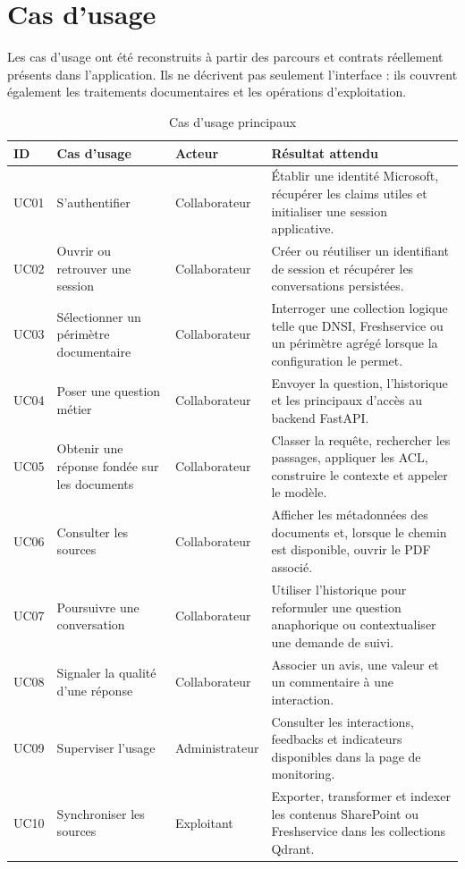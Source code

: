 \section{Cas d'usage}

Les cas d'usage ont été reconstruits à partir des parcours et contrats réellement présents dans l'application. Ils ne décrivent pas seulement l'interface : ils couvrent également les traitements documentaires et les opérations d'exploitation.

\begin{table}[H]
\centering
\caption{Cas d'usage principaux}
\label{tab:usecases_ch4}
\begin{tabular}{p{1.2cm}p{3.6cm}p{2.8cm}p{6.2cm}}
\toprule
\textbf{ID} & \textbf{Cas d'usage} & \textbf{Acteur} & \textbf{Résultat attendu} \\
\midrule
UC01 & S'authentifier & Collaborateur & Établir une identité Microsoft, récupérer les claims utiles et initialiser une session applicative. \\
UC02 & Ouvrir ou retrouver une session & Collaborateur & Créer ou réutiliser un identifiant de session et récupérer les conversations persistées. \\
UC03 & Sélectionner un périmètre documentaire & Collaborateur & Interroger une collection logique telle que DNSI, Freshservice ou un périmètre agrégé lorsque la configuration le permet. \\
UC04 & Poser une question métier & Collaborateur & Envoyer la question, l'historique et les principaux d'accès au backend FastAPI. \\
UC05 & Obtenir une réponse fondée sur les documents & Collaborateur & Classer la requête, rechercher les passages, appliquer les ACL, construire le contexte et appeler le modèle. \\
UC06 & Consulter les sources & Collaborateur & Afficher les métadonnées des documents et, lorsque le chemin est disponible, ouvrir le PDF associé. \\
UC07 & Poursuivre une conversation & Collaborateur & Utiliser l'historique pour reformuler une question anaphorique ou contextualiser une demande de suivi. \\
UC08 & Signaler la qualité d'une réponse & Collaborateur & Associer un avis, une valeur et un commentaire à une interaction. \\
UC09 & Superviser l'usage & Administrateur & Consulter les interactions, feedbacks et indicateurs disponibles dans la page de monitoring. \\
UC10 & Synchroniser les sources & Exploitant & Exporter, transformer et indexer les contenus SharePoint ou Freshservice dans les collections Qdrant. \\
\bottomrule
\end{tabular}
\end{table}

